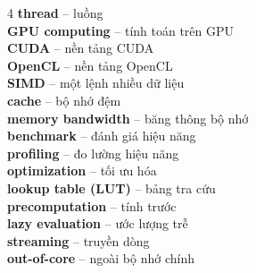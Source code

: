 \begin{multicols}{4}
\textbf{thread} -- luồng\\
\textbf{GPU computing} -- tính toán trên GPU\\
\textbf{CUDA} -- nền tảng CUDA\\
\textbf{OpenCL} -- nền tảng OpenCL\\
\textbf{SIMD} -- một lệnh nhiều dữ liệu\\
\textbf{cache} -- bộ nhớ đệm\\
\textbf{memory bandwidth} -- băng thông bộ nhớ\\
\textbf{benchmark} -- đánh giá hiệu năng\\
\textbf{profiling} -- đo lường hiệu năng\\
\textbf{optimization} -- tối ưu hóa\\
\textbf{lookup table (LUT)} -- bảng tra cứu\\
\textbf{precomputation} -- tính trước\\
\textbf{lazy evaluation} -- ước lượng trễ\\
\textbf{streaming} -- truyền dòng\\
\textbf{out-of-core} -- ngoài bộ nhớ chính\\


\end{multicols}
